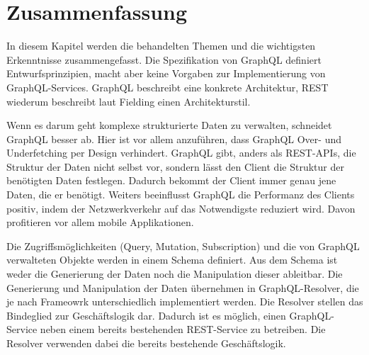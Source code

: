 \chapter{Zusammenfassung}
In diesem Kapitel werden die behandelten Themen und die wichtigsten Erkenntnisse zusammengefasst.
\newline
Die Spezifikation von GraphQL definiert Entwurfsprinzipien, macht aber keine Vorgaben zur Implementierung von GraphQL-Services.
GraphQL beschreibt eine konkrete Architektur, REST wiederum beschreibt laut Fielding einen Architekturstil.
\newline

Wenn es darum geht komplexe strukturierte Daten zu verwalten, schneidet GraphQL besser ab.
Hier ist vor allem anzuführen, dass GraphQL Over- und Underfetching per Design verhindert.
GraphQL gibt, anders als REST-APIs, die Struktur der Daten nicht selbst vor, sondern lässt den Client die Struktur der benötigten Daten festlegen. 
Dadurch bekommt der Client immer genau jene Daten, die er benötigt.
Weiters beeinflusst GraphQL die Performanz des Clients positiv, indem der Netzwerkverkehr auf das Notwendigste reduziert wird.
Davon profitieren vor allem mobile Applikationen.
\newline

Die Zugriffsmöglichkeiten (Query, Mutation, Subscription) und die von GraphQL verwalteten Objekte werden in einem Schema definiert.
Aus dem Schema ist weder die Generierung der Daten noch die Manipulation dieser ableitbar.
Die Generierung und Manipulation der Daten übernehmen in GraphQL-Resolver, die je nach Frameowrk unterschiedlich implementiert werden.
Die Resolver stellen das Bindeglied zur Geschäftslogik dar.
Dadurch ist es möglich, einen GraphQL-Service neben einem bereits bestehenden REST-Service zu betreiben.
Die Resolver verwenden dabei die bereits bestehende Geschäftslogik.
\newline

